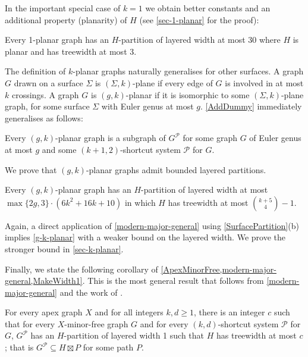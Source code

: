 \documentclass{patmorin}
\newcommand{\PP}{\mathcal{P}}
\renewcommand{\geq}{\geqslant}
\begin{document}
In the important special case of $k=1$ we obtain better constants and an additional property (planarity) of $H$ (see \cref{sec-1-planar} for the proof):

\begin{thm}
\label{1-planar}
Every 1-planar graph has an $H$-partition of layered width at most 30 where $H$ is planar and has treewidth at most 3.
\end{thm}


The definition of $k$-planar graphs naturally generalises for other surfaces. A graph $G$ drawn on a surface $\Sigma$ is $(\Sigma,k)$-plane if every edge of $G$ is involved in at most $k$ crossings.  A graph $G$ is $(g,k)$-planar if it is isomorphic to some $(\Sigma,k)$-plane graph, for some surface $\Sigma$ with Euler genus at most $g$. 
\cref{AddDummy} immediately generalises as follows:

\begin{obs}
\label{gAddDummy}
Every $(g,k)$-planar graph is a subgraph of $G^\PP$ for some graph $G$ of Euler genus at most $g$ and some $(k+1,2)$-shortcut system $\PP$ for $G$. 
\end{obs}

We prove that $(g,k)$-planar graphs admit bounded layered partitions. 

\begin{thm}
\label{g-k-planar}
Every $(g,k)$-planar graph has an $H$-partition of layered width at most 
$\max\{2g,3\}\cdot(6k^2+16k+10)$ in which $H$ has treewidth at most $\binom{k+5}{4}-1$.
\end{thm}


Again, a direct application of \cref{modern-major-general} using \cref{SurfacePartition}(b) implies \cref{g-k-planar} with a weaker bound on the layered width. We prove the stronger bound in \cref{sec-k-planar}. 

Finally, we state the following corollary of \cref{ApexMinorFree,modern-major-general,MakeWidth1}. This is the most general result that follows from \cref{modern-major-general} and the work of \citet{dujmovic.joret.ea:planar}. 

\begin{thm}
For every apex graph $X$ and for all integers $k,d\geq 1$, there is an integer $c$ such that for every $X$-minor-free graph $G$ and for every $(k,d)$-shortcut system $\PP$ for $G$,  $G^\PP$ has an $H$-partition of layered width 1 such that $H$ has treewidth at most $c$; that is $G^\PP \subseteq H \boxtimes P$ for some path $P$. 
\end{thm}
\end{document}

